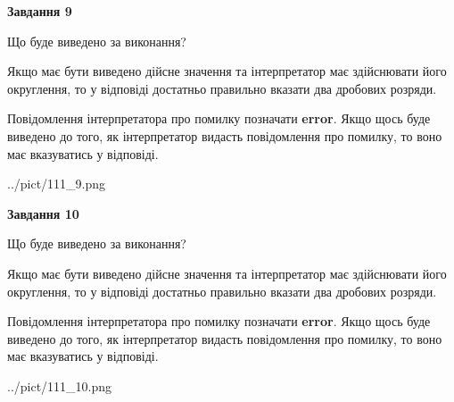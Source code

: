\documentclass[12pt, ukrainian]{article}
\begin{document}
{\begin {Large}
{\begin {center}\textbf{Завдання 9}\end {center}}\par
Що буде виведено за виконання? \par

Якщо має бути виведено дійсне значення та інтерпретатор має здійснювати його округлення, 
то у відповіді достатньо правильно вказати два дробових розряди.

Повідомлення інтерпретатора про помилку позначати \textbf{error}.
Якщо щось буде виведено до того, як інтерпретатор видасть повідомлення про помилку, 
то воно має вказуватись у відповіді. \par

\begin{center}
	{../pict/111_9.png}
\end{center}
\newpage

{\begin {center}\textbf{Завдання 10}\end {center}}\par
Що буде виведено за виконання? \par

Якщо має бути виведено дійсне значення та інтерпретатор має здійснювати його округлення, 
то у відповіді достатньо правильно вказати два дробових розряди.

Повідомлення інтерпретатора про помилку позначати \textbf{error}.
Якщо щось буде виведено до того, як інтерпретатор видасть повідомлення про помилку, 
то воно має вказуватись у відповіді. \par

\begin{center}
	{../pict/111_10.png}
\end{center}
\newpage

\end {Large}}
\end{document}
